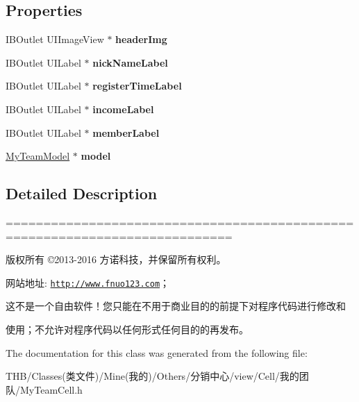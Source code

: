 \subsection*{Properties}
\begin{DoxyCompactItemize}
\item 
\mbox{\label{interface_my_team_cell_a626453619a2bef61f9e9815ad99fdeb5}} 
I\+B\+Outlet U\+I\+Image\+View $\ast$ {\bfseries header\+Img}
\item 
\mbox{\label{interface_my_team_cell_a7b351f537cca66f9372be49bbf9cf812}} 
I\+B\+Outlet U\+I\+Label $\ast$ {\bfseries nick\+Name\+Label}
\item 
\mbox{\label{interface_my_team_cell_a7aa59d6ca3098879828b8e42c7f5e162}} 
I\+B\+Outlet U\+I\+Label $\ast$ {\bfseries register\+Time\+Label}
\item 
\mbox{\label{interface_my_team_cell_ac50712f6e9f49eeb176e23fabf297b28}} 
I\+B\+Outlet U\+I\+Label $\ast$ {\bfseries income\+Label}
\item 
\mbox{\label{interface_my_team_cell_ad75d16131fe52ac9d01101f32493111c}} 
I\+B\+Outlet U\+I\+Label $\ast$ {\bfseries member\+Label}
\item 
\mbox{\label{interface_my_team_cell_a59eb6d09658ce8af792889dd77593333}} 
\mbox{\hyperlink{interface_my_team_model}{My\+Team\+Model}} $\ast$ {\bfseries model}
\end{DoxyCompactItemize}


\subsection{Detailed Description}
============================================================================

版权所有 ©2013-\/2016 方诺科技，并保留所有权利。

网站地址\+: \href{http://www.fnuo123.com}{\tt http\+://www.\+fnuo123.\+com}； 



这不是一个自由软件！您只能在不用于商业目的的前提下对程序代码进行修改和

使用；不允许对程序代码以任何形式任何目的的再发布。 

 

The documentation for this class was generated from the following file\+:\begin{DoxyCompactItemize}
\item 
T\+H\+B/\+Classes(类文件)/\+Mine(我的)/\+Others/分销中心/view/\+Cell/我的团队/My\+Team\+Cell.\+h\end{DoxyCompactItemize}
